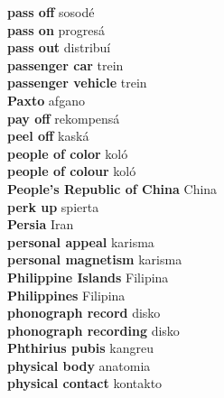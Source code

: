 \textbf{ pass off  } sosodé \\
\textbf{ pass on  } progresá \\
\textbf{ pass out  } distribuí \\
\textbf{ passenger car  } trein \\
\textbf{ passenger vehicle  } trein \\
\textbf{ Paxto  } afgano \\
\textbf{ pay off  } rekompensá \\
\textbf{ peel off  } kaská \\
\textbf{ people of color  } koló \\
\textbf{ people of colour  } koló \\
\textbf{ People’s Republic of China  } China \\
\textbf{ perk up  } spierta \\
\textbf{ Persia  } Iran \\
\textbf{ personal appeal  } karisma \\
\textbf{ personal magnetism  } karisma \\
\textbf{ Philippine Islands  } Filipina \\
\textbf{ Philippines  } Filipina \\
\textbf{ phonograph record  } disko \\
\textbf{ phonograph recording  } disko \\
\textbf{ Phthirius pubis  } kangreu \\
\textbf{ physical body  } anatomia \\
\textbf{ physical contact  } kontakto \\
